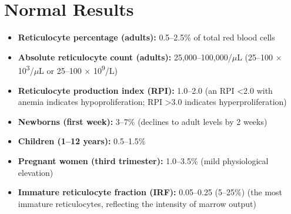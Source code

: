 \section*{Normal Results}
\begin{itemize}
  \item \textbf{Reticulocyte percentage (adults):} 0.5--2.5\% of total red blood cells
  \item \textbf{Absolute reticulocyte count (adults):} 25,000--100,000/$\mu$L (25--100 $\times$ 10\textsuperscript{3}/$\mu$L or 25--100 $\times$ 10\textsuperscript{9}/L)
  \item \textbf{Reticulocyte production index (RPI):} 1.0--2.0 (an RPI <2.0 with anemia indicates hypoproliferation; RPI >3.0 indicates hyperproliferation)
  \item \textbf{Newborns (first week):} 3--7\% (declines to adult levels by 2 weeks)
  \item \textbf{Children (1--12 years):} 0.5--1.5\%
  \item \textbf{Pregnant women (third trimester):} 1.0--3.5\% (mild physiological elevation)
  \item \textbf{Immature reticulocyte fraction (IRF):} 0.05--0.25 (5--25\%) (the most immature reticulocytes, reflecting the intensity of marrow output)
\end{itemize}

